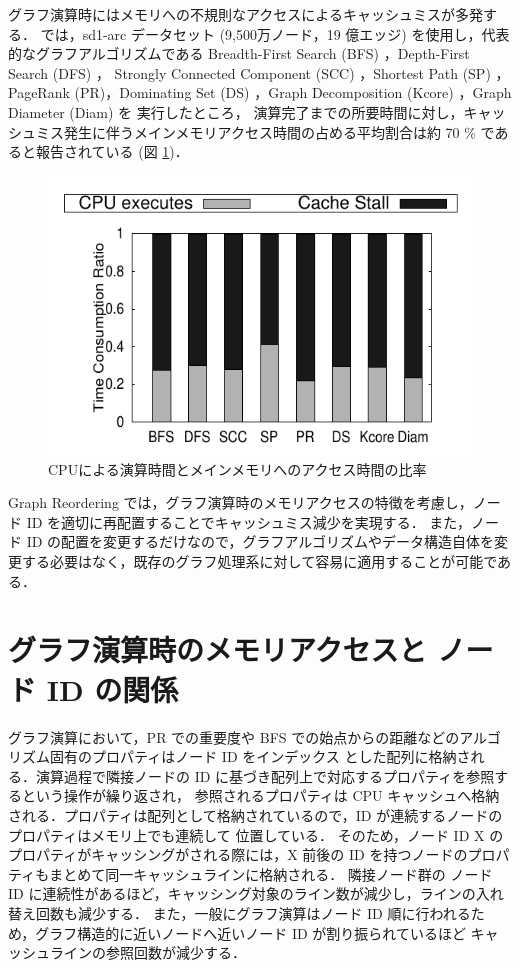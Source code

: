 グラフ演算時にはメモリへの不規則なアクセスによるキャッシュミスが多発する．\cite{wei2016speedup} では，sd1-arc データセット (9,500万ノード，19 億エッジ)
を使用し，代表的なグラフアルゴリズムである 
Breadth-First Search (BFS) \cite{cormen2009introduction}，Depth-First Search (DFS) \cite{cormen2009introduction}，
Strongly Connected Component (SCC) \cite{sharir1981strong}，Shortest Path (SP) \cite{cormen2009introduction}，
PageRank (PR)，Dominating Set (DS) \cite{cockayne1978domination}，Graph Decomposition (Kcore) \cite{batagelj2003m}，Graph Diameter (Diam) を
実行したところ， 演算完了までの所要時間に対し，キャッシュミス発生に伴うメインメモリアクセス時間の占める平均割合は約 70 \% であると報告されている (図 \ref{cache_miss})．
\begin{figure}[t]
  \centering
  \includegraphics[scale=1.0]{./figure/cache_miss.pdf}
  \caption{CPUによる演算時間とメインメモリへのアクセス時間の比率}
  \label{cache_miss}
\end{figure}

Graph Reordering では，グラフ演算時のメモリアクセスの特徴を考慮し，ノード ID を適切に再配置することでキャッシュミス減少を実現する．
また，ノード ID の配置を変更するだけなので，グラフアルゴリズムやデータ構造自体を変更する必要はなく，既存のグラフ処理系に対して容易に適用することが可能である．

\section{グラフ演算時のメモリアクセスと ノード ID の関係}
グラフ演算において，PR での重要度や BFS での始点からの距離などのアルゴリズム固有のプロパティはノード ID をインデックス
とした配列に格納される．演算過程で隣接ノードの ID に基づき配列上で対応するプロパティを参照するという操作が繰り返され，
参照されるプロパティは CPU キャッシュへ格納される．プロパティは配列として格納されているので，ID が連続するノードのプロパティはメモリ上でも連続して
位置している．
そのため，ノード ID X のプロパティがキャッシングがされる際には，X 前後の ID を持つノードのプロパティもまとめて同一キャッシュラインに格納される．
隣接ノード群の ノード ID に連続性があるほど，キャッシング対象のライン数が減少し，ラインの入れ替え回数も減少する．
また，一般にグラフ演算はノード ID 順に行われるため，グラフ構造的に近いノードへ近いノード ID が割り振られているほど
キャッシュラインの参照回数が減少する．

